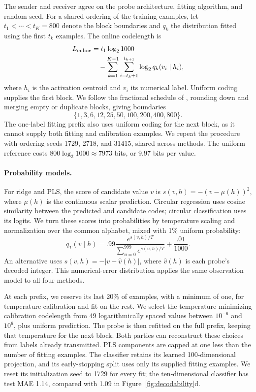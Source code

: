 The sender and receiver agree on the probe architecture, fitting algorithm, and random seed.
For a shared ordering of the training examples, let $t_1<\cdots<t_K=800$ denote the block boundaries and $q_k$ the distribution fitted using the first $t_k$ examples.
The online codelength is
\begin{align}
 L_{\mathrm{online}} &= t_1\log_2 1000 \notag\\
 &\quad-\sum_{k=1}^{K-1}\sum_{i=t_k+1}^{t_{k+1}}
 \log_2 q_k(v_i\mid h_i),
 \label{eq:probe-online-code}
\end{align}
where $h_i$ is the activation centroid and $v_i$ its numerical label.
Uniform coding supplies the first block.
We follow the fractional schedule of \citet{voita2020information}, rounding down and merging empty or duplicate blocks, giving boundaries
\[
 \{1,3,6,12,25,50,100,200,400,800\}.
\]
The one-label fitting prefix also uses uniform coding for the next block, as it cannot supply both fitting and calibration examples.
We repeat the procedure with ordering seeds 1729, 2718, and 31415, shared across methods.
The uniform reference costs $800\log_2 1000\approx7973$ bits, or 9.97 bits per value.

\paragraph{Probability models.}

For ridge and PLS, the score of candidate value $v$ is $s(v,h)=-(v-\mu(h))^2$, where $\mu(h)$ is the continuous scalar prediction.
Circular regression uses cosine similarity between the predicted and candidate codes; circular classification uses its logits.
We turn these scores into probabilities by temperature scaling and normalization over the common alphabet, mixed with 1\% uniform probability:
\begin{equation}
 q_T(v\mid h)=.99\frac{e^{s(v,h)/T}}{\sum_{u=0}^{999}e^{s(u,h)/T}}+\frac{.01}{1000}.
 \label{eq:probe-mdl-probability}
\end{equation}
An alternative uses $s(v,h)=-|v-\hat v(h)|$, where $\hat v(h)$ is each probe's decoded integer.
This numerical-error distribution applies the same observation model to all four methods.

At each prefix, we reserve its last 20\% of examples, with a minimum of one, for temperature calibration and fit on the rest.
We select the temperature minimizing calibration codelength from 49 logarithmically spaced values between $10^{-6}$ and $10^6$, plus uniform prediction.
The probe is then refitted on the full prefix, keeping that temperature for the next block.
Both parties can reconstruct these choices from labels already transmitted.
PLS components are capped at one less than the number of fitting examples.
The classifier retains its learned 100-dimensional projection, and its early-stopping split uses only its supplied fitting examples.
We reset its initialization seed to 1729 for every fit; the ten-dimensional classifier has test MAE 1.14, compared with 1.09 in Figure~\ref{fig:decodability}d.


